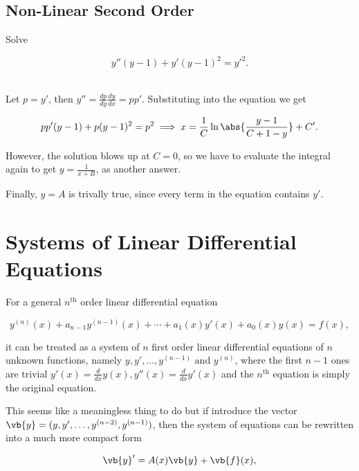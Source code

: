 \documentclass[english,a4paper,12pt]{report}
\begin{document}
\section{Non-Linear Second Order}

{Solve 

\begin{equation}
    y''(y-1)+y'(y-1)^2=y'^2.
\end{equation}~
}
{Let \(p = y'\), then \(\displaystyle y''=\frac{dp}{dy} \frac{dy}{dx} = p p'  \). Substituting into the equation we get

\begin{equation}
    p p' (y-1) + p(y-1)^2 = p^2 \implies x = \frac{1}{C} \ln \abs{\frac{y-1}{C+1-y} } +C'. 
\end{equation}

However, the solution blows up at \(C = 0\), so we have to evaluate the integral again to get \(y = \frac{1}{x+B} \), as another answer. 

Finally, \(y = A\) is trivally true, since every term in the equation contains \(y'\). 
}


\chapter{Systems of Linear Differential Equations}

For a general \(n^{\text{th}} \) order linear differential equation

\begin{equation}
    y^{(n)}(x) + a_{n-1}y^{(n-1)}(x) + \cdots + a_1 (x)y'(x) + a_0 (x)y(x) = f(x),   
\end{equation}

it can be treated as a system of \(n\) first order linear differential equations of \(n\) unknown functions, namely \(y,y',\ldots ,y^{(n-1)}  \text { and } y^{(n)} \), where the first \(n-1\) ones are trivial  \(y'(x) = \frac{d}{dx}y(x), y''(x) = \frac{d}{dx} y'(x)\) and the \(n^{\text{th}} \) equation is simply the original equation.

This seems like a meaningless thing to do but if introduce the vector \(\vb{y} = (y,y',\ldots ,y^{(n-2)}, y^{(n-1)})\), then the system of equations can be rewritten into a much more compact form

\begin{equation}
    \vb{y} ' = A (x)\vb{y} + \vb{f} (x), \label{inhomosys} 
\end{equation}
\end{document}
